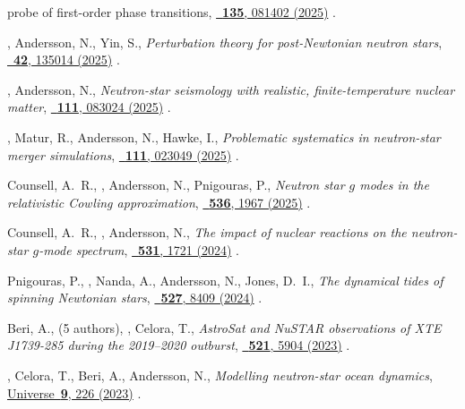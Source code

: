\begin{publist}
{    probe of first-order phase transitions},
    \href{https://doi.org/10.1103/8hvq-6dy7}%
    {\prl\ \textbf{135}, 081402 (2025)}
    .
    \item \fgittins, Andersson, N., \advisedStudent{}Yin, S.,
    \textit{Perturbation theory for post-Newtonian neutron stars},
    \href{https://doi.org/10.1088/1361-6382/ade83f}%
    {\cqg\ \textbf{42}, 135014 (2025)}
    .
    \item \fgittins, Andersson, N.,
    \textit{Neutron-star seismology with realistic, finite-temperature nuclear
    matter},
    \href{https://doi.org/10.1103/PhysRevD.111.083024}%
    {\prd\ \textbf{111}, 083024 (2025)}
    .
    \item \fgittins, \advisedStudent{}Matur, R., Andersson, N., Hawke, I.,
    \textit{Problematic systematics in neutron-star merger simulations},
    \href{https://doi.org/10.1103/PhysRevD.111.023049}%
    {\prd\ \textbf{111}, 023049 (2025)}
    .
    \item \advisedStudent{}Counsell, A.~R., \fgittins, Andersson, N., Pnigouras, P.,
    \textit{Neutron star $g$ modes in the relativistic Cowling approximation},
    \href{https://doi.org/10.1093/mnras/stae2721}%
    {\mnras\ \textbf{536}, 1967 (2025)}
    .
    \item \advisedStudent{}Counsell, A.~R., \fgittins, Andersson, N.,
    \textit{The impact of nuclear reactions on the neutron-star $g$-mode spectrum},
    \href{https://doi.org/10.1093/mnras/stae1242}%
    {\mnras\ \textbf{531}, 1721 (2024)}
    .
    \item Pnigouras, P., \fgittins, Nanda, A., Andersson, N., Jones, D.~I.,
    \textit{The dynamical tides of spinning Newtonian stars},
    \href{https://doi.org/10.1093/mnras/stad3593}%
    {\mnras\ \textbf{527}, 8409 (2024)}
    .
    \item Beri, A., (5 authors), \fgittins, \advisedStudent{}Celora, T.,
    \textit{AstroSat and NuSTAR observations of XTE J1739-285 during the
    2019--2020 outburst},
    \href{https://doi.org/10.1093/mnras/stad902}%
    {\mnras\ \textbf{521}, 5904 (2023)}
    .
    \item \fgittins, \advisedStudent{}Celora, T., Beri, A., Andersson, N.,
    \textit{Modelling neutron-star ocean dynamics},
    \href{https://doi.org/10.3390/universe9050226}%
    {Universe\ \textbf{9}, 226 (2023)}
    .

\end{publist}
